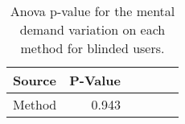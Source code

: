 
\begin{table}[!htb]
\centering
\caption{Anova p-value for the mental demand variation on each method for blinded users.}
\label{tab:blocanova_md_var_blind}
\begin{tabular}{lrrrrr}
\toprule
Source & P-Value \\
\midrule
Method &   0.943 \\
\bottomrule
\end{tabular}
\end{table}

